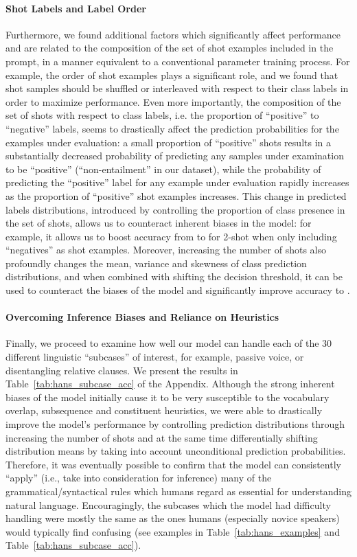 \documentclass[11pt]{article}
\begin{document}
\paragraph{Shot Labels and Label Order} Furthermore, we found additional factors which significantly affect performance and are related to the composition of the set of shot examples included in the prompt, in a manner equivalent to a conventional parameter training process. For example, the order of shot examples plays a significant role, and we found that shot samples should be shuffled or interleaved with respect to their class labels in order to maximize performance. Even more importantly, the composition of the set of shots with respect to class labels, i.e. the proportion of ``positive'' to ``negative'' labels, seems to drastically affect the prediction probabilities for the examples under evaluation:
a small proportion of ``positive'' shots results in a substantially decreased probability of predicting any samples under examination to be ``positive'' (``non-entailment'' in our dataset), while the probability of predicting the ``positive'' label for any example under evaluation rapidly increases as the proportion of ``positive'' shot examples increases. This change in predicted labels distributions, introduced by controlling the proportion of class presence in the set of shots, allows us to counteract inherent biases in the model: for example, it allows us to boost accuracy from  to  for 2-shot when only including ``negatives'' as shot examples. Moreover, increasing the number of shots also profoundly changes the mean, variance and skewness of class prediction distributions, and when combined with shifting the decision threshold, it can be used to counteract the biases of the model and significantly improve accuracy to .

\paragraph{Overcoming Inference Biases and Reliance on Heuristics} Finally, we proceed to examine how well our model can handle each of the 30 different linguistic ``subcases'' of interest, for example, passive voice, or disentangling relative clauses. We present the results in Table~\ref{tab:hans_subcase_acc} of the Appendix. Although the strong inherent biases of the model initially cause it to be very susceptible to the vocabulary overlap, subsequence and constituent heuristics, we were able to drastically improve the model's performance by controlling prediction distributions through increasing the number of shots and at the same time differentially shifting distribution means by taking into account unconditional prediction probabilities. Therefore, it was eventually possible to confirm that the model can consistently ``apply'' (i.e., take into consideration for inference) many of the grammatical/syntactical rules which humans regard as essential for understanding natural language. Encouragingly, the subcases which the model had difficulty handling were mostly the same as the ones humans (especially novice speakers) would typically find confusing (see examples in Table~\ref{tab:hans_examples} and Table~\ref{tab:hans_subcase_acc}).
\end{document}
